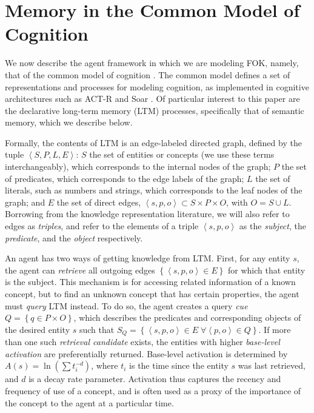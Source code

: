 \documentclass[10pt,letterpaper]{article}
\newcommand{\setof}[1]{\left \{ #1 \right \}}
\newcommand{\tuple}[1]{\left \langle #1 \right \rangle }
\begin{document}
\section{Memory in the Common Model of Cognition}

We now describe the agent framework in which we are modeling FOK, namely, that of the common model of cognition \cite{Laird2017AStandardModel}.
The common model defines a set of representations and processes for modeling cognition, as implemented in cognitive architectures such as ACT-R and Soar \cite{Anderson2007HowCanThe,Laird2012TheSoarCognitive}.
Of particular interest to this paper are the declarative long-term memory (LTM) processes, specifically that of semantic memory, which we describe below.

Formally, the contents of LTM is an edge-labeled directed graph, defined by the tuple $\tuple{S, P, L, E}$:
$S$ the set of entities or concepts (we use these terms interchangeably), which corresponds to the internal nodes of the graph;
$P$ the set of predicates, which corresponds to the edge labels of the graph;
$L$ the set of literals, such as numbers and strings, which corresponds to the leaf nodes of the graph;
and $E$ the set of direct edges, $\tuple{s, p, o} \subset S{\times}P{\times}O$, with $O=S{\cup}L$.
Borrowing from the knowledge representation literature, we will also refer to edges as \textit{triples}, and refer to the elements of a triple $\tuple{s, p, o}$ as the \textit{subject}, the \textit{predicate}, and the \textit{object} respectively.

An agent has two ways of getting knowledge from LTM.
First, for any entity $s$, the agent can \textit{retrieve} all outgoing edges $\setof{\tuple{s, p, o}{\in}E}$ for which that entity is the subject.
This mechanism is for accessing related information of a known concept, but to find an unknown concept that has certain properties, the agent must \textit{query} LTM instead.
To do so, the agent creates a query \textit{cue} $Q = \setof{q{\in}P{\times}O}$, which describes the predicates and corresponding objects of the desired entity $s$ such that $S_Q = \setof{\tuple{s, p, o}{\in}E \; \forall \tuple{p, o}{\in}Q}$.
If more than one such \textit{retrieval candidate} exists, the entities with higher \textit{base-level activation} are preferentially returned.
Base-level activation is determined by $A(s) = \ln (\sum {t_i^{-d}})$, where $t_i$ is the time since the entity $s$ was last retrieved, and $d$ is a decay rate parameter.
Activation thus captures the recency and frequency of use of a concept, and is often used as a proxy of the importance of the concept to the agent at a particular time.
\end{document}
